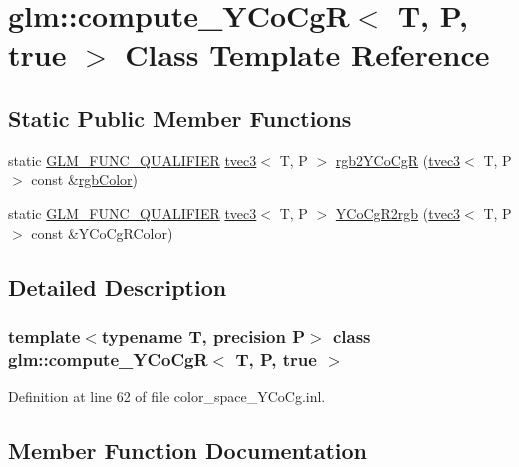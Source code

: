 \hypertarget{classglm_1_1compute___y_co_cg_r_3_01_t_00_01_p_00_01true_01_4}{}\section{glm\+::compute\+\_\+\+Y\+Co\+CgR$<$ T, P, true $>$ Class Template Reference}
\label{classglm_1_1compute___y_co_cg_r_3_01_t_00_01_p_00_01true_01_4}
\subsection*{Static Public Member Functions}
\begin{DoxyCompactItemize}
\item 
static \mbox{\hyperlink{setup_8hpp_a33fdea6f91c5f834105f7415e2a64407}{G\+L\+M\+\_\+\+F\+U\+N\+C\+\_\+\+Q\+U\+A\+L\+I\+F\+I\+ER}} \mbox{\hyperlink{structglm_1_1tvec3}{tvec3}}$<$ T, P $>$ \mbox{\hyperlink{classglm_1_1compute___y_co_cg_r_3_01_t_00_01_p_00_01true_01_4_a82803505194346c9a8d9d17d770a8c45}{rgb2\+Y\+Co\+CgR}} (\mbox{\hyperlink{structglm_1_1tvec3}{tvec3}}$<$ T, P $>$ const \&\mbox{\hyperlink{group__gtx__color__space_ga36b0619e31daf57bc4a54dac2dcf34b7}{rgb\+Color}})
\item 
static \mbox{\hyperlink{setup_8hpp_a33fdea6f91c5f834105f7415e2a64407}{G\+L\+M\+\_\+\+F\+U\+N\+C\+\_\+\+Q\+U\+A\+L\+I\+F\+I\+ER}} \mbox{\hyperlink{structglm_1_1tvec3}{tvec3}}$<$ T, P $>$ \mbox{\hyperlink{classglm_1_1compute___y_co_cg_r_3_01_t_00_01_p_00_01true_01_4_a06da2d71b6b47d04e9579eef10022cbb}{Y\+Co\+Cg\+R2rgb}} (\mbox{\hyperlink{structglm_1_1tvec3}{tvec3}}$<$ T, P $>$ const \&Y\+Co\+Cg\+R\+Color)
\end{DoxyCompactItemize}


\subsection{Detailed Description}
\subsubsection*{template$<$typename T, precision P$>$\newline
class glm\+::compute\+\_\+\+Y\+Co\+Cg\+R$<$ T, P, true $>$}



Definition at line 62 of file color\+\_\+space\+\_\+\+Y\+Co\+Cg.\+inl.



\subsection{Member Function Documentation}
\mbox{\label{classglm_1_1compute___y_co_cg_r_3_01_t_00_01_p_00_01true_01_4_a82803505194346c9a8d9d17d770a8c45}} 
